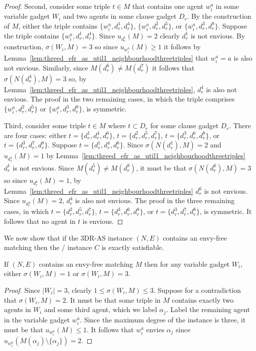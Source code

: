 \begin{proof}
Second, consider some triple $t\in M$ that contains one agent $w_i^a$ in some variable gadget $W_i$ and two agents in some clause gadget $D_r$. By the construction of $M$, either the triple contains $\{ w_i^u, d_r^1, d_r^4 \}$, $\{ w_i^a, d_r^2, d_r^5 \}$, or $\{ w_i^a, d_r^3, d_r^8 \}$. Suppose the triple contains $\{ w_i^a, d_r^1, d_r^4 \}$. Since $u_{d_r^1}(M)=2$ clearly $d_r^1$ is not envious. By construction, $\sigma(W_i, M)=3$ so since $u_{w_i^a}(M)\geq 1$ it follows by Lemma~\ref{lem:threed_efr_as_util1_neighbourhoodthreetriples} that $w_i^u=a$ is also not envious. Similarly, since $M(d_r^6) \neq M(d_r^7)$ it follows that $\sigma(N(d_r^4), M)=3$ so, by Lemma~\ref{lem:threed_efr_as_util1_neighbourhoodthreetriples}, $d_r^4$ is also not envious. The proof in the two remaining cases, in which the triple comprises $\{ w_i^a, d_r^2, d_r^5 \}$ or $\{ w_i^a, d_r^3, d_r^8 \}$, is symmetric.

Third, consider some triple $t\in M$ where $t\subset D_r$ for some clause gadget $D_r$. There are four cases: either $t=\{ d_r^1, d_r^4, d_r^6 \}$, $t=\{ d_r^2, d_r^5, d_r^7 \}$, $t=\{ d_r^3, d_r^6, d_r^8 \}$, or $t=\{ d_r^3, d_r^7, d_r^8 \}$. Suppose $t=\{ d_r^1, d_r^4, d_r^6 \}$. Since $\sigma(N(d_r^1), M)=2$ and $u_{d_r^1}(M)=1$ by Lemma~\ref{lem:threed_efr_as_util1_neighbourhoodthreetriples} $d_r^1$ is not envious. Since $M(d_r^5) \neq M(d_r^8)$, it must be that $\sigma(N(d_r^6), M)=3$ so since $u_{d_r^6}(M)=1$, by Lemma~\ref{lem:threed_efr_as_util1_neighbourhoodthreetriples} $d_r^6$ is not envious. Since $u_{d_r^4}(M)=2$, $d_r^4$ is also not envious. The proof in the three remaining cases, in which $t=\{ d_r^2, d_r^5, d_r^7 \}$, $t=\{ d_r^3, d_r^6, d_r^8 \}$, or $t=\{ d_r^3, d_r^7, d_r^8 \}$, is symmetric. It follows that no agent in $t$ is envious. 
\end{proof}

We now show that if the 3DR-AS instance $(N, E)$ contains an envy-free matching then the \porschenxsatvariant/ instance $C$ is exactly satisfiable.

\begin{lem}
\label{lem:threed_efr_as_regularenvy_seconddirection_triangle_split_stay}
If $(N, E)$ contains an envy-free matching $M$ then for any variable gadget $W_i$, either $\sigma(W_i, M)=1$ or $\sigma(W_i, M)=3$.
\end{lem}
\begin{proof}
Since $|W_i|=3$, clearly $1 \leq \sigma(W_i, M) \leq 3$. Suppose for a contradiction that $\sigma(W_i, M)=2$. It must be that some triple in $M$ contains exactly two agents in $W_i$ and some third agent, which we label $\alpha_j$. Label the remaining agent in the variable gadget $w_i^a$. Since the maximum degree of the instance is three, it must be that $u_{w_i^a}(M)\leq 1$. It follows that $w_i^a$ envies $\alpha_j$ since $u_{w_i^a}(M(\alpha_j) \setminus \{ \alpha_j \}) = 2$.
\end{proof}

